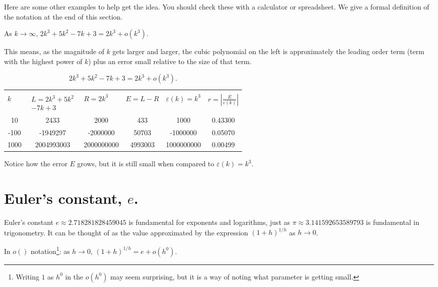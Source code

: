 Here are some other examples to help get the idea.  You should check these with a calculator or spreadsheet.  We give a formal definition of the notation at the end of this section. 
 
As  $k \rightarrow \infty$,  $2k^3 + 5 k^2 - 7 k + 3 = 2k^3 + o (k^3 )$.     
 
This means, as the magnitude of  $k$ gets larger and larger, the cubic polynomial on the left is approximately the leading order term (term with the highest power of  $k$) plus an error small relative to the size of that term.   

\begin{table}
\caption{$2k^3 + 5 k^2 - 7 k + 3=2k^3+o(k^3)$.}
\label{tab:basic2}
\begin{tabular}{|S[table-format=4]|S[table-format=10]|S[table-format=10]|S[table-format=7]|S[table-format=10]|S[table-format=1.5]|}
 \\
 & 
 & & 
 &
 &
 \\
  & 2433 & 2000 & 433 & 1000 & 0.43300 \\
-100 & -1949297 &  -2000000 & 50703 & -1000000 & 0.05070 \\
1000 & 2004993003 & 2000000000 & 4993003 & 1000000000 & 0.00499 \\
\hline
\end{tabular}
\end{table}

Notice how the error $E$ grows, but it is still small when compared to $\varepsilon(k) = k^3$.  

\section{Euler's constant, $e$.}
Euler's constant $e \approx \num{2.718281828459045}$ is fundamental for exponents and logarithms, just as  $\pi \approx \num{3.141592653589793} $ is fundamental in trigonometry.  It can be thought of as the value approximated by the expression $(1 + h)^{1/h}$ as $h \rightarrow 0$.

In $o()$ notation\footnote{Writing $1$ as  $h^0$ in the $o(h^0)$ may seem surprising, but it is a way of noting what parameter is getting small.}: as $h \rightarrow 0$, $(1 + h)^{1/h}=e+o(h^0)$.

